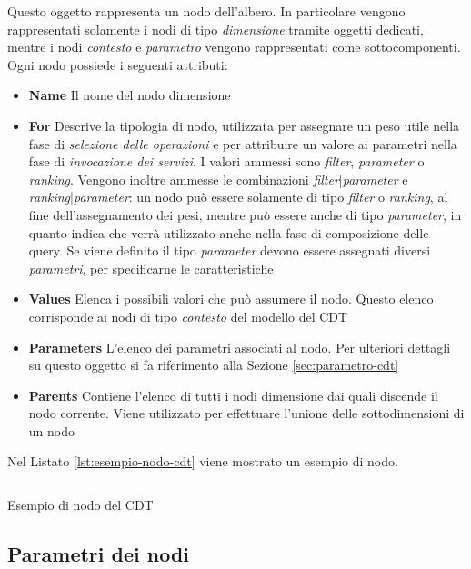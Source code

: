 Questo oggetto rappresenta un nodo dell'albero. In particolare vengono rappresentati solamente i nodi di tipo \emph{dimensione} tramite oggetti dedicati, mentre i nodi \emph{contesto} e \emph{parametro} vengono rappresentati come sottocomponenti. Ogni nodo possiede i seguenti attributi:

\begin{itemize}
	\item \textbf{Name}
	Il nome del nodo dimensione
	\item \textbf{For}
	Descrive la tipologia di nodo, utilizzata per assegnare un peso utile nella fase di \emph{selezione delle operazioni} e per attribuire un valore ai parametri nella fase di \emph{invocazione dei servizi}. I valori ammessi sono \emph{filter}, \emph{parameter} o \emph{ranking}. Vengono inoltre ammesse le combinazioni \emph{filter}|\emph{parameter} e \emph{ranking}|\emph{parameter}: un nodo può essere solamente di tipo \emph{filter} o \emph{ranking}, al fine dell'assegnamento dei pesi, mentre può essere anche di tipo \emph{parameter}, in quanto indica che verrà utilizzato anche nella fase di composizione delle query. Se viene definito il tipo \emph{parameter} devono essere assegnati diversi \emph{parametri}, per specificarne le caratteristiche
	\item \textbf{Values}
	Elenca i possibili valori che può assumere il nodo. Questo elenco corrisponde ai nodi di tipo \emph{contesto} del modello del CDT
	\item \textbf{Parameters}
	L'elenco dei parametri associati al nodo. Per ulteriori dettagli su questo oggetto si fa riferimento alla Sezione \ref{sec:parametro-cdt}
	\item \textbf{Parents}
	Contiene l'elenco di tutti i nodi dimensione dai quali discende il nodo corrente. Viene utilizzato per effettuare l'unione delle sottodimensioni di un nodo
\end{itemize}

Nel Listato \ref{lst:esempio-nodo-cdt} viene mostrato un esempio di nodo.

\begin{listing}[H]
	\inputminted{json}{5-implementazione-backend/Codice/esempio_nodo_cdt.json}
	\caption{Esempio di nodo del CDT}
	\label{lst:esempio-nodo-cdt}
\end{listing}

\subsection{Parametri dei nodi\label{sec:parametro-cdt}}

